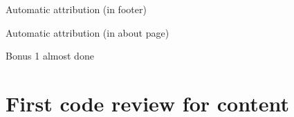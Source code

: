 \documentclass[10pt,aspectratio=169]{beamer}
\begin{document}
\begin{frame}[fragile]{Automatic attribution (in footer)}
\vfill{}\vfill
\end{frame}


\begin{frame}[fragile]{Automatic attribution (in about page)}
\vfill{}\vfill
\end{frame}


\begin{frame}[fragile]{Bonus 1 almost done}
\vfill{}\vfill
\end{frame}


\begin{frame}[standout]
\end{frame}


\section{First code review for content}
\end{document}
